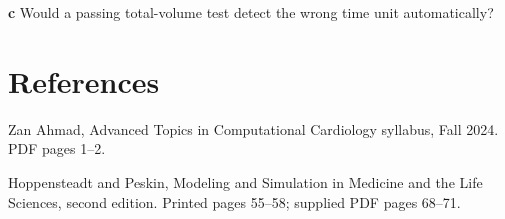 \documentclass[11pt,letterpaper]{article}
\theoremstyle{definition}\newtheorem{definition}{Definition}\newtheorem{example}{Example}
\numberwithin{equation}{section}
\begin{document}
\textbf{c} Would a passing total-volume test detect the wrong time unit automatically?

\section*{References}
\noindent\begin{minipage}{\linewidth}
Zan Ahmad, Advanced Topics in Computational Cardiology syllabus, Fall 2024. PDF pages 1--2.

\end{minipage}\par\medskip
\noindent\begin{minipage}{\linewidth}
Hoppensteadt and Peskin, Modeling and Simulation in Medicine and the Life Sciences, second edition. Printed pages 55--58; supplied PDF pages 68--71.

\end{minipage}\par\medskip
\end{document}
